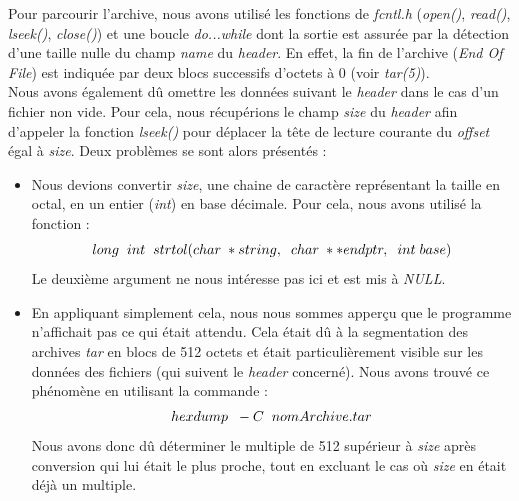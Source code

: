 \documentclass[12pt, a4paper]{report}
\begin{document}
\hspace{0.5cm}Pour parcourir l'archive, nous avons utilisé les fonctions de \textit{fcntl.h} (\textit{open()}, \textit{read()}, \textit{lseek()}, \textit{close()}) et une boucle \textit{do...while} dont la sortie est assurée par la détection d'une taille nulle du champ \textit{name} du \textit{header}. En effet, la fin de l'archive (\textit{End Of File}) est indiquée par deux blocs successifs d'octets à 0 (voir \textit{tar(5)}). \\

\hspace{0.5cm}Nous avons également dû omettre les données suivant le \textit{header} dans le cas d'un fichier non vide. Pour cela, nous récupérions le champ \textit{size} du \textit{header} afin d'appeler la fonction \textit{lseek()} pour déplacer la tête de lecture courante du \textit{offset} égal à \textit{size}. Deux problèmes se sont alors présentés : 
\begin{itemize}
\item \hspace{0.2cm}Nous devions convertir \textit{size}, une chaine de caractère représentant la taille en octal, en un entier (\textit{int}) en base décimale. Pour cela, nous avons utilisé la fonction : \[long\hspace{0.2cm}int\hspace{0.2cm}strtol(char\hspace{0.1cm}*string,\hspace{0.2cm}char\hspace{0.1cm}**endptr,\hspace{0.2cm}int\hspace{0.1cm}base)\]Le deuxième argument ne nous intéresse pas ici et est mis à \textit{NULL}.
\item \hspace{0.2cm}En appliquant simplement cela, nous nous sommes apperçu que le programme n'affichait pas ce qui était attendu. Cela était dû à la segmentation des archives \textit{tar} en blocs de 512 octets et était particulièrement visible sur les données des fichiers (qui suivent le \textit{header} concerné). Nous avons trouvé ce phénomène en utilisant la commande : \[hexdump\hspace{0.2cm}-C\hspace{0.2cm}nomArchive.tar\] Nous avons donc dû déterminer le multiple de 512 supérieur à \textit{size} après conversion qui lui était le plus proche, tout en excluant le cas où \textit{size} en était déjà un multiple.
\end{itemize}
\end{document}
